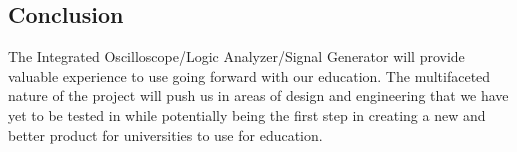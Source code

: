 \subsection{Conclusion}
	The Integrated Oscilloscope/Logic Analyzer/Signal Generator will provide valuable experience to use going forward with our education. The multifaceted nature of the project will push us in areas of design and engineering that we have yet to be tested in while potentially being the first step in creating a new and better product for universities to use for education.